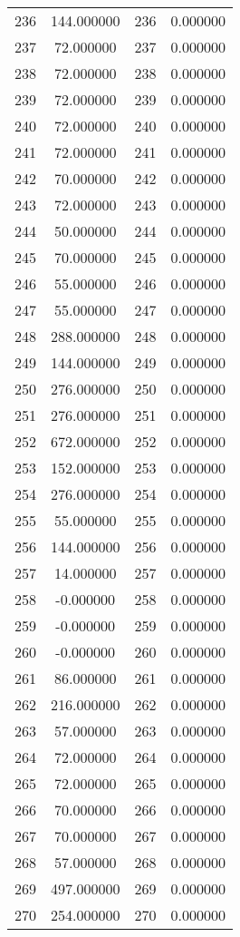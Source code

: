 \documentclass[12pt]{article}
\begin{document}
\begin{longtable}{@{}cccc@{}}
236 & 144.000000 & 236 & 0.000000 \\
237 & 72.000000 & 237 & 0.000000 \\
238 & 72.000000 & 238 & 0.000000 \\
239 & 72.000000 & 239 & 0.000000 \\
240 & 72.000000 & 240 & 0.000000 \\
241 & 72.000000 & 241 & 0.000000 \\
242 & 70.000000 & 242 & 0.000000 \\
243 & 72.000000 & 243 & 0.000000 \\
244 & 50.000000 & 244 & 0.000000 \\
245 & 70.000000 & 245 & 0.000000 \\
246 & 55.000000 & 246 & 0.000000 \\
247 & 55.000000 & 247 & 0.000000 \\
248 & 288.000000 & 248 & 0.000000 \\
249 & 144.000000 & 249 & 0.000000 \\
250 & 276.000000 & 250 & 0.000000 \\
251 & 276.000000 & 251 & 0.000000 \\
252 & 672.000000 & 252 & 0.000000 \\
253 & 152.000000 & 253 & 0.000000 \\
254 & 276.000000 & 254 & 0.000000 \\
255 & 55.000000 & 255 & 0.000000 \\
256 & 144.000000 & 256 & 0.000000 \\
257 & 14.000000 & 257 & 0.000000 \\
258 & -0.000000 & 258 & 0.000000 \\
259 & -0.000000 & 259 & 0.000000 \\
260 & -0.000000 & 260 & 0.000000 \\
261 & 86.000000 & 261 & 0.000000 \\
262 & 216.000000 & 262 & 0.000000 \\
263 & 57.000000 & 263 & 0.000000 \\
264 & 72.000000 & 264 & 0.000000 \\
265 & 72.000000 & 265 & 0.000000 \\
266 & 70.000000 & 266 & 0.000000 \\
267 & 70.000000 & 267 & 0.000000 \\
268 & 57.000000 & 268 & 0.000000 \\
269 & 497.000000 & 269 & 0.000000 \\
270 & 254.000000 & 270 & 0.000000 \\

\end{longtable}
\end{document}
